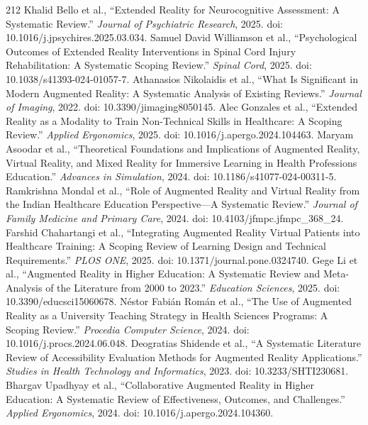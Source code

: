\begin{thebibliography}{212}
 Khalid Bello et al., ``Extended Reality for Neurocognitive Assessment: A Systematic Review.'' \emph{Journal of Psychiatric Research}, 2025. doi: 10.1016/j.jpsychires.2025.03.034.
 Samuel David Williamson et al., ``Psychological Outcomes of Extended Reality Interventions in Spinal Cord Injury Rehabilitation: A Systematic Scoping Review.'' \emph{Spinal Cord}, 2025. doi: 10.1038/s41393-024-01057-7.
 Athanasios Nikolaidis et al., ``What Is Significant in Modern Augmented Reality: A Systematic Analysis of Existing Reviews.'' \emph{Journal of Imaging}, 2022. doi: 10.3390/jimaging8050145.
 Alec Gonzales et al., ``Extended Reality as a Modality to Train Non-Technical Skills in Healthcare: A Scoping Review.'' \emph{Applied Ergonomics}, 2025. doi: 10.1016/j.apergo.2024.104463.
 Maryam Asoodar et al., ``Theoretical Foundations and Implications of Augmented Reality, Virtual Reality, and Mixed Reality for Immersive Learning in Health Professions Education.'' \emph{Advances in Simulation}, 2024. doi: 10.1186/s41077-024-00311-5.
 Ramkrishna Mondal et al., ``Role of Augmented Reality and Virtual Reality from the Indian Healthcare Education Perspective---A Systematic Review.'' \emph{Journal of Family Medicine and Primary Care}, 2024. doi: 10.4103/jfmpc.jfmpc_368_24.
 Farshid Chahartangi et al., ``Integrating Augmented Reality Virtual Patients into Healthcare Training: A Scoping Review of Learning Design and Technical Requirements.'' \emph{PLOS ONE}, 2025. doi: 10.1371/journal.pone.0324740.
 Gege Li et al., ``Augmented Reality in Higher Education: A Systematic Review and Meta-Analysis of the Literature from 2000 to 2023.'' \emph{Education Sciences}, 2025. doi: 10.3390/educsci15060678.
 N{\'e}stor Fabi{\'a}n Rom{\'a}n et al., ``The Use of Augmented Reality as a University Teaching Strategy in Health Sciences Programs: A Scoping Review.'' \emph{Procedia Computer Science}, 2024. doi: 10.1016/j.procs.2024.06.048.
 Deogratias Shidende et al., ``A Systematic Literature Review of Accessibility Evaluation Methods for Augmented Reality Applications.'' \emph{Studies in Health Technology and Informatics}, 2023. doi: 10.3233/SHTI230681.
 Bhargav Upadhyay et al., ``Collaborative Augmented Reality in Higher Education: A Systematic Review of Effectiveness, Outcomes, and Challenges.'' \emph{Applied Ergonomics}, 2024. doi: 10.1016/j.apergo.2024.104360.

\end{thebibliography}
